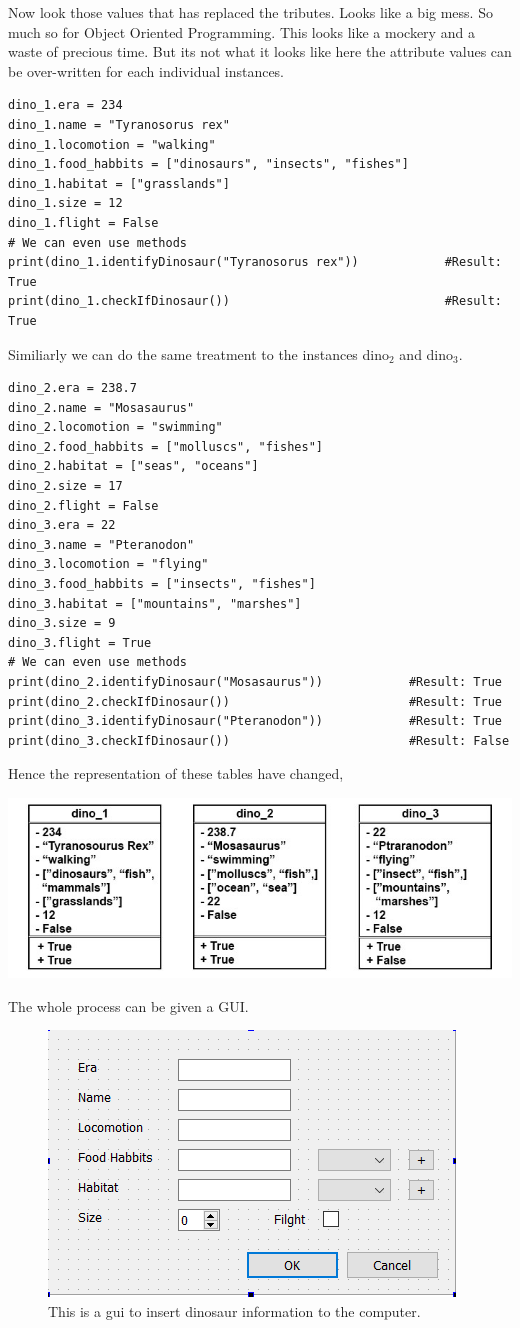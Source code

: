 \documentclass[11pt]{article}
\begin{document}
Now look those values that has replaced the   tributes. Looks like a big mess. So much so for Object Oriented Programming. This looks like a mockery and a waste of precious time. But its not what it looks like here the attribute values can be over-written for each individual instances.
\begin{verbatim}
dino_1.era = 234
dino_1.name = "Tyranosorus rex"
dino_1.locomotion = "walking"
dino_1.food_habbits = ["dinosaurs", "insects", "fishes"]
dino_1.habitat = ["grasslands"]
dino_1.size = 12
dino_1.flight = False
# We can even use methods
print(dino_1.identifyDinosaur("Tyranosorus rex"))            #Result: True
print(dino_1.checkIfDinosaur())                              #Result: True
\end{verbatim}

Similiarly we can do the same treatment to the instances dino\(_{\text{2}}\) and dino\(_{\text{3}}\).


\begin{verbatim}
dino_2.era = 238.7
dino_2.name = "Mosasaurus"
dino_2.locomotion = "swimming"
dino_2.food_habbits = ["molluscs", "fishes"]
dino_2.habitat = ["seas", "oceans"]
dino_2.size = 17
dino_2.flight = False
dino_3.era = 22
dino_3.name = "Pteranodon"
dino_3.locomotion = "flying"
dino_3.food_habbits = ["insects", "fishes"]
dino_3.habitat = ["mountains", "marshes"]
dino_3.size = 9
dino_3.flight = True
# We can even use methods
print(dino_2.identifyDinosaur("Mosasaurus"))            #Result: True
print(dino_2.checkIfDinosaur())                         #Result: True
print(dino_3.identifyDinosaur("Pteranodon"))            #Result: True
print(dino_3.checkIfDinosaur())                         #Result: False
\end{verbatim}

Hence the representation of these tables have changed,

\begin{center}
\includegraphics[width=.9\linewidth]{./img/dino_uml.jpg}
\end{center}
The whole process can be given a GUI.

\begin{figure}[htbp]
\centering
\includegraphics[width=.9\linewidth]{./img/dino_gui.png}
\caption{\label{fig:orgfebb40d}
This is a gui to insert dinosaur information to the computer.}
\end{figure}
\end{document}
